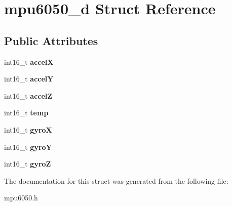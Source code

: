 \hypertarget{structmpu6050__d}{}\section{mpu6050\+\_\+d Struct Reference}
\label{structmpu6050__d}
\subsection*{Public Attributes}
\begin{DoxyCompactItemize}
\item 
\mbox{\label{structmpu6050__d_adb7ccae71a0c5e7f258586d0495c6a8c}} 
int16\+\_\+t {\bfseries accelX}
\item 
\mbox{\label{structmpu6050__d_aaa5222f3976416bcae0e75a9ba65f0fe}} 
int16\+\_\+t {\bfseries accelY}
\item 
\mbox{\label{structmpu6050__d_a0fdcaed0c39c82e43beb78ccb49c47f2}} 
int16\+\_\+t {\bfseries accelZ}
\item 
\mbox{\label{structmpu6050__d_ad9660eb6bd1f5d93fd06b8d8f8edbfeb}} 
int16\+\_\+t {\bfseries temp}
\item 
\mbox{\label{structmpu6050__d_a2c4aa4ef6faddb414f6a638a45d5f634}} 
int16\+\_\+t {\bfseries gyroX}
\item 
\mbox{\label{structmpu6050__d_aae7232a3273a9b40ab0b97a18cb42451}} 
int16\+\_\+t {\bfseries gyroY}
\item 
\mbox{\label{structmpu6050__d_a5e65eb26d9829b2fff3eeb96823f0fa1}} 
int16\+\_\+t {\bfseries gyroZ}
\end{DoxyCompactItemize}


The documentation for this struct was generated from the following file\+:\begin{DoxyCompactItemize}
\item 
mpu6050.\+h\end{DoxyCompactItemize}
